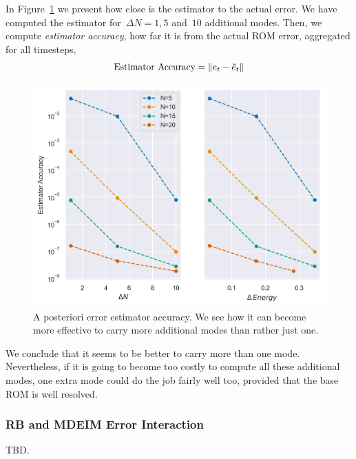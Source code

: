 \documentclass[../../thesis.tex]{subfiles}
\begin{document}
In Figure~\ref{fig:estimator_accuracy} we present how close is the estimator to the actual error.
We have computed the estimator for~\mbox{$\Delta N = 1, 5$} and~$10$ additional modes.
Then, we compute \textit{estimator accuracy}, how far it is from the actual ROM error,
aggregated for all timesteps, 
\begin{equation}
    \text{Estimator Accuracy} = \norm{e_t - \tilde{e}_t} 
\end{equation}
\begin{figure}[h]
    \centering
    \includegraphics[width=1\columnwidth]{research_project/piston/figures/rb_certification/estimator_accuracy.png}
    \caption{A posteriori error estimator accuracy.
    We see how it can become more effective to carry more additional modes than rather just one.}
    \label{fig:estimator_accuracy}
\end{figure}
We conclude that it seems to be better to carry more than one mode.
Nevertheless, if it is going to become too costly to compute all these additional modes,
one extra mode could do the job fairly well too, provided that the base ROM is well resolved.

\subsubsection{RB and MDEIM Error Interaction}
TBD. 
\end{document}
